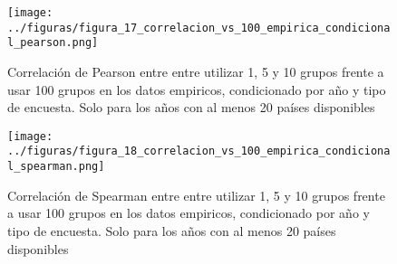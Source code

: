 \begin{figure}[H] %
    \centering %
    \texttt{[image: ../figuras/figura\_17\_correlacion\_vs\_100\_empirica\_condicional\_pearson.png]} %
    \caption{Correlación de Pearson entre entre utilizar 1, 5 y 10 grupos frente a usar 100 grupos en los datos empiricos, condicionado por año y tipo de encuesta. Solo para los años con al menos 20 países disponibles}
    \label{fig:17} %
\end{figure}

\begin{figure}[H] %
    \centering %
    \texttt{[image: ../figuras/figura\_18\_correlacion\_vs\_100\_empirica\_condicional\_spearman.png]} %
    \caption{Correlación de Spearman entre entre utilizar 1, 5 y 10 grupos frente a usar 100 grupos en los datos empiricos, condicionado por año y tipo de encuesta. Solo para los años con al menos 20 países disponibles}
    \label{fig:18} %
\end{figure}


